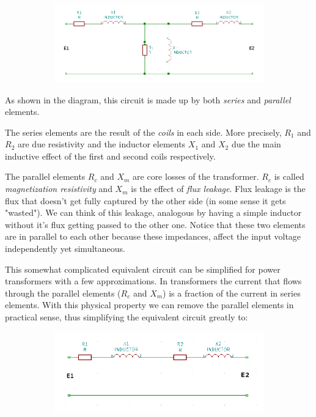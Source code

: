 \documentclass{article}
\begin{document}
	\begin{figure}[h!]
	\centering
	\begin{subfigure}[b]{1\linewidth}
		\includegraphics[width=\linewidth]{real_transformer.png}
	\end{subfigure}
	\end{figure}
	
	As shown in the diagram, this circuit is made up by both \textit{series} and \textit{parallel} elements.
	
	The series elements are the result of the \textit{coils} in each side. More precisely, $R_1$ and $R_2$ are due resistivity and the inductor elements $X_1$ and $X_2$ due the main inductive effect of the first and second coils respectively.
	
	The parallel elements $R_c$ and $X_m$ are core losses of the transformer.
	$R_c$ is called \textit{magnetization resistivity} and $X_m$ is the effect of \textit{flux leakage}.
	Flux leakage is the flux that doesn't get fully captured by the other side (in some sense it gets "wasted").
	We can think of this leakage, analogous by having a simple inductor without it's flux getting passed to the other one. Notice that these two elements are in parallel to each other because these impedances, affect the input voltage independently yet simultaneous.
	
	This somewhat complicated equivalent circuit can be simplified for power transformers with a few approximations.
	In transformers the current that flows through the parallel elements ($R_c$ and $X_m$) is a fraction of the current in series elements.
	With this physical property we can remove the parallel elements in practical sense, thus simplifying the equivalent circuit greatly to:
		
	\begin{figure}[h!]
	\centering
	\begin{subfigure}[b]{0.8\linewidth}
		\includegraphics[width=\linewidth]{transformer_approx1.png}
	\end{subfigure}
	\end{figure}
	
\end{document}
